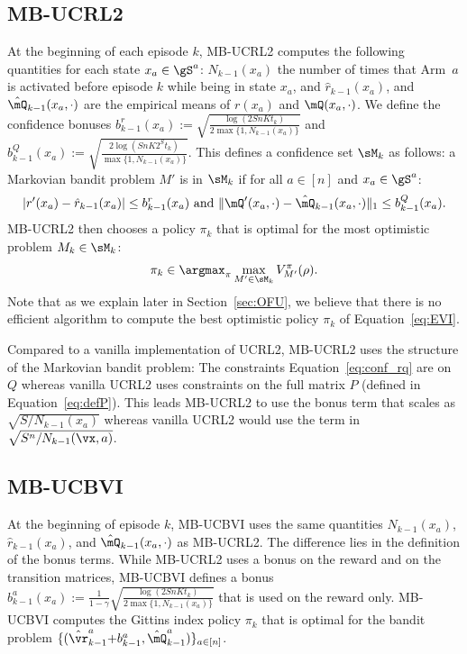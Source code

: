 \subsection{MB-UCRL2}
At the beginning of each episode $k$, MB-UCRL2 computes the following quantities for each state $x_a\in\gS^a$: $N_{k-1}(x_a)$ the number of times that Arm~$a$ is activated before episode $k$ while being in state $x_a$, and $\hat{r}_{k-1}(x_a)$, and $\hat{\mQ}_{k-1}(x_a,\cdot)$ are the empirical means of $r(x_a)$ and $\mQ(x_a,\cdot)$. We define the confidence bonuses
$b^r_{k-1}(x_a):=\sqrt{\frac{\log(2SnKt_{k})}{2\max\{1,N_{k-1}(x_a)\}}}$
and
$b^Q_{k-1}(x_a):=\sqrt{\frac{2\log(SnK2^St_k)}{\max\{1,N_{k-1}(x_a)\}}}$.
This defines a confidence set $\sM_k$  as follows:  a Markovian bandit problem $M'$
is in $\sM_k$ if for all $a\in[n]$ and $x_a\in\gS^a$: 
\begin{align}
    \label{eq:conf_rq}
    \vert{r'}(x_a) - \hat{r}_{k-1}(x_a)\vert \le b^r_{k-1}(x_a) \text{ and }
    \lVert {\mQ'}(x_a,\cdot) - \hat{\mQ}_{k-1}(x_a,\cdot)\rVert_1 \le b^Q_{k-1}(x_a).            
\end{align}
MB-UCRL2 then chooses a policy $\pi_k$ that is optimal for the most optimistic problem $M_k\in\sM_k$:
\begin{align}
    \pi_k \in \argmax_{\pi} \max_{M'\in\sM_k}V^{\pi}_{M'}(\rho).
    \label{eq:EVI}
\end{align}
Note that as we explain later in Section~\ref{sec:OFU}, we believe that there is no  efficient algorithm to compute the best optimistic policy $\pi_k$ of Equation~\eqref{eq:EVI}.

Compared to a vanilla implementation of UCRL2, MB-UCRL2 uses the structure of the Markovian bandit problem: The constraints Equation~\eqref{eq:conf_rq} are on $Q$ whereas vanilla UCRL2 uses constraints on the full matrix $P$ (defined in Equation~\eqref{eq:defP}). This leads MB-UCRL2 to use the bonus term that scales as $\sqrt{S/N_{k-1}(x_a)}$ whereas vanilla UCRL2 would use the term in $\sqrt{S^n/N_{k-1}(\vx, a)}$.

\subsection{MB-UCBVI}
At the beginning of episode $k$, MB-UCBVI uses the same quantities $N_{k-1}(x_a)$, $\hat{r}_{k-1}(x_a)$, and $\hat{\mQ}_{k-1}(x_a,\cdot)$ as MB-UCRL2. The difference lies in the definition of the bonus terms. While MB-UCRL2 uses a bonus on the reward and on the transition matrices, MB-UCBVI defines a bonus $b_{k-1}^a(x_a){:=}\frac{1}{1-\gamma}\sqrt{\frac{\log(2SnKt_k)}{2\max\{1,N_{k-1}(x_a)\}}}$ that is used on the reward only. MB-UCBVI computes the Gittins index policy $\pi_k$ that is optimal for the bandit problem $\{(\hat{\vr}_{k-1}^a {+}b_{k-1}^a, \hat{\mQ}_{k-1}^a)\}_{a\in[n]}$. 

